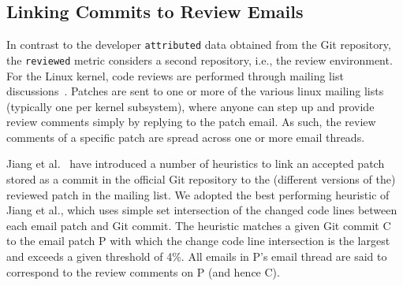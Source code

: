 





\subsection{Linking Commits to Review Emails}
\label{sec:link-comm-revi}

In contrast to the developer \texttt{attributed} data obtained from the Git repository, the \texttt{reviewed} metric considers a second repository, i.e., the review environment. For the Linux kernel, code reviews are performed through mailing list discussions~\cite{icst17,msr13jojo,jiang14}. %
Patches are sent to one or more of the various linux mailing lists (typically one per kernel subsystem), where anyone can step up and provide review comments simply by replying to the patch email. As such, the review comments of a specific patch are spread across one or more email threads.

Jiang et al.~\cite{msr13jojo,jiang14} have introduced a number of heuristics to link an accepted patch stored as a commit in the official Git repository to the (different versions of the) reviewed patch in the mailing list. We adopted the best performing heuristic of Jiang et al., which %
uses simple set intersection of the changed code lines between each email patch and Git commit. The heuristic matches a given Git commit C to the email patch P with which the change code line intersection is the largest and exceeds a given threshold of 4\%. All emails in P's email thread are said to correspond to the review comments on P (and hence C).%

